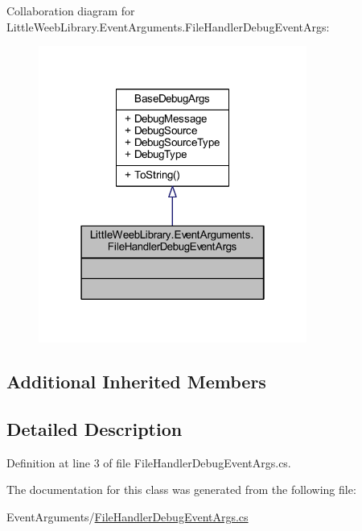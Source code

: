 Collaboration diagram for Little\+Weeb\+Library.\+Event\+Arguments.\+File\+Handler\+Debug\+Event\+Args\+:\nopagebreak
\begin{figure}[H]
\begin{center}
\leavevmode
\includegraphics[width=250pt]{class_little_weeb_library_1_1_event_arguments_1_1_file_handler_debug_event_args__coll__graph}
\end{center}
\end{figure}
\subsection*{Additional Inherited Members}


\subsection{Detailed Description}


Definition at line 3 of file File\+Handler\+Debug\+Event\+Args.\+cs.



The documentation for this class was generated from the following file\+:\begin{DoxyCompactItemize}
\item 
Event\+Arguments/\mbox{\hyperlink{_file_handler_debug_event_args_8cs}{File\+Handler\+Debug\+Event\+Args.\+cs}}\end{DoxyCompactItemize}
